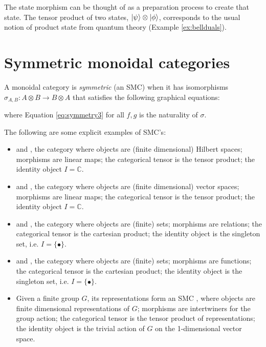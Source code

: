 \noindent The state morphism can be thought of as a preparation process to create that state. The tensor product of two states, $| \psi \rangle\otimes| \phi \rangle$, corresponds to the usual notion of product state from quantum theory (Example \ref{ex:bellduals}).

\section{Symmetric monoidal categories}

\begin{defn}
A monoidal category is \emph{symmetric} (an SMC) when it has  isomorphisms
$\sigma_{A,B}:A\otimes B\to B\otimes A$ that satisfies the following graphical equations:
\begin{equation}
\label{eq:symmetry}

\end{equation}
\begin{equation}
\label{eq:symmetry2}

\end{equation}
\begin{equation}
\label{eq:symmetry3}

\end{equation}
\end{defn}
\noindent where Equation \ref{eq:symmetry3} for all $f,g$ is the naturality of $\sigma$.

\begin{examples}
\label{ex:smcs}
The following are some explicit examples of SMC's:
\begin{itemize}
\item {} and , the category where objects are (finite dimensional) Hilbert spaces; morphisms are linear maps; the categorical tensor is the tensor product; the identity object $I=\mathbb{C}$.

\item {} and , the category where objects are (finite dimensional) vector spaces; morphisms are linear maps; the categorical tensor is the tensor product; the identity object $I=\mathbb{C}$.

\item {} and , the category where objects are (finite) sets; morphisms are relations; the categorical tensor is the cartesian product; the identity object is the singleton set, i.e. $I=\{\bullet\}$.

\item {} and , the category where objects are (finite) sets; morphisms are functions; the categorical tensor is the cartesian product; the identity object is the singleton set, i.e. $I=\{\bullet\}$.

\item Given a finite group $G$, its representations form an SMC , where objects are finite dimensional representations of $G$; morphisms are intertwiners for the group action; the categorical tensor is the tensor product of representations; the identity object is the trivial action of $G$ on the 1-dimensional vector space.
\end{itemize}
\end{examples}

